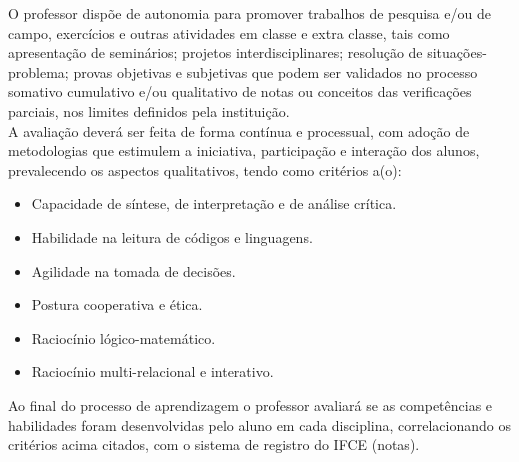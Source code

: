 O professor dispõe de autonomia para promover trabalhos de pesquisa e/ou de campo, exercícios e outras atividades em classe e extra classe, tais como apresentação de seminários; projetos interdisciplinares; resolução de situações- problema; provas objetivas e subjetivas que podem ser validados no processo somativo cumulativo e/ou qualitativo de notas ou conceitos das verificações parciais, nos limites definidos pela instituição.\\

A avaliação deverá ser feita de forma contínua e processual, com adoção de metodologias que estimulem a iniciativa, participação e interação dos alunos, prevalecendo os aspectos qualitativos, tendo como critérios a(o):

\begin{itemize}
\item Capacidade de síntese, de interpretação e de análise crítica.
\item Habilidade na leitura de códigos e linguagens.
\item Agilidade na tomada de decisões.
\item Postura cooperativa e ética.
\item Raciocínio lógico-matemático.
\item Raciocínio multi-relacional e interativo.
\end{itemize}

Ao final do processo de aprendizagem o professor avaliará se as competências e habilidades foram desenvolvidas pelo aluno em cada disciplina, correlacionando os critérios acima citados, com o sistema de registro do IFCE (notas).\\


